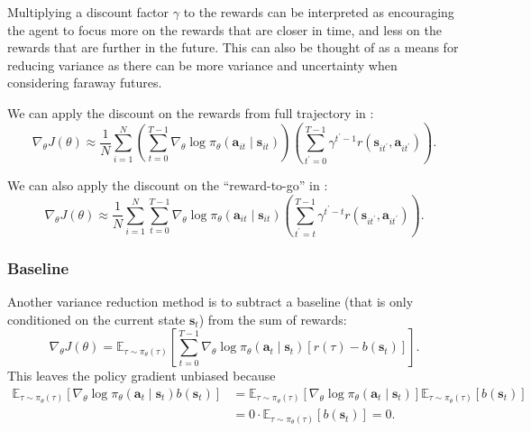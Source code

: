 \documentclass{article}
\def\rva{{\mathbf{a}}}
\def\rvs{{\mathbf{s}}}
\begin{document}
Multiplying a discount factor $\gamma$ to the rewards can be interpreted as encouraging the agent to focus more on the rewards that are closer in time, and less on the rewards that are further in the future. This can also be thought of as a means for reducing variance as there can be more variance and uncertainty when considering faraway futures.

We can apply the discount on the rewards from full trajectory in :
\begin{equation} \label{eq:pg_discount}
    \nabla_{\theta} J(\theta) \approx \frac{1}{N} \sum_{i=1}^{N}\left(\sum_{t=0}^{T-1} \nabla_{\theta} \log \pi_{\theta}\left(\rva_{i t} \mid \rvs_{i t}\right)\right)\left(\sum_{t^{\prime}=0}^{T-1} \gamma^{t^{\prime}-1} r\left(\rvs_{i t^{\prime}}, \rva_{i t^{\prime}}\right)\right).
\end{equation}

We can also apply the discount on the ``reward-to-go'' in :
\begin{equation} \label{eq:pg_rtg_discount}
    \nabla_{\theta} J(\theta) \approx \frac{1}{N} \sum_{i=1}^{N} \sum_{t=0}^{T-1} \nabla_{\theta} \log \pi_{\theta}\left(\rva_{i t} \mid \rvs_{i t}\right)\left(\sum_{t^{\prime}=t}^{T-1} \gamma^{t^{\prime}-t} r\left(\rvs_{i t^{\prime}}, \rva_{i t^{\prime}}\right)\right).
\end{equation}

\subsubsection{Baseline}

Another variance reduction method is to subtract a baseline (that is only conditioned on the current state $\rvs_t$) from the sum of rewards:
\begin{equation}
    \nabla_{\theta} J(\theta)=\mathbb{E}_{\tau \sim \pi_{\theta}(\tau)}\left[\sum_{t=0}^{T-1} \nabla_{\theta} \log \pi_\theta(\rva_t \mid \rvs_t) [r(\tau)-b(\rvs_t)]\right].
\end{equation}
This leaves the policy gradient unbiased because
\begin{align*}
    \mathbb{E}_{\tau \sim \pi_{\theta}(\tau)}[\nabla_{\theta} \log \pi_\theta(\rva_t \mid \rvs_t) b(\rvs_t)]
            &= \mathbb{E}_{\tau \sim \pi_{\theta}(\tau)}[\nabla_{\theta} \log \pi_\theta(\rva_t \mid \rvs_t)] \mathbb{E}_{\tau \sim \pi_{\theta}(\tau)}[b(\rvs_t)] \\
            &= 0 \cdot \mathbb{E}_{\tau \sim \pi_{\theta}(\tau)}[b(\rvs_t)] = 0.
\end{align*}
\end{document}
